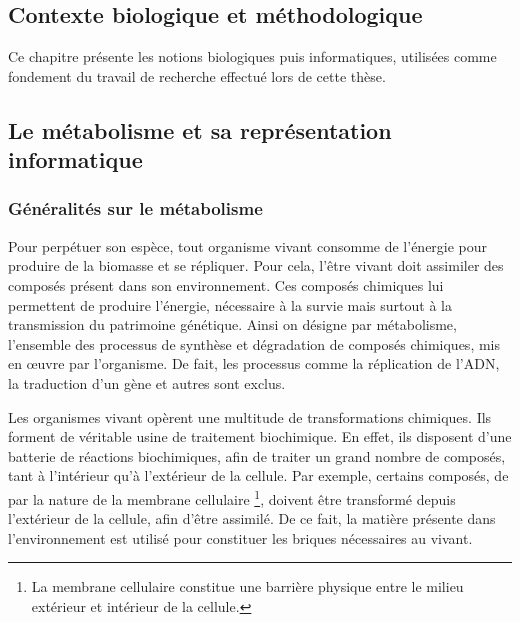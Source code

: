 \begin{refsegment}
	\chapter{Contexte biologique et méthodologique}

    Ce chapitre présente les notions biologiques puis informatiques, utilisées comme fondement du travail de recherche effectué lors de cette thèse.
    
    
    \section{Le métabolisme et sa représentation informatique}
    \subsection{Généralités sur le métabolisme}
    
    Pour perpétuer son espèce, tout organisme vivant consomme de l'énergie pour produire de la biomasse et se répliquer. Pour cela, l'être vivant doit assimiler des composés présent dans son environnement. Ces composés chimiques lui permettent de produire l'énergie, nécessaire  à la survie mais surtout à la transmission du patrimoine génétique. Ainsi on désigne par métabolisme, l'ensemble des processus de synthèse et dégradation de composés chimiques, mis en œuvre par l'organisme. De fait, les processus comme la réplication de l'\acrfull{ADN}, la traduction d'un gène et autres sont exclus.
    
    
    Les organismes vivant opèrent une multitude de transformations chimiques. Ils forment de véritable usine de traitement biochimique. En effet, ils disposent d'une batterie de réactions biochimiques, afin de traiter un grand nombre de composés, tant à l'intérieur qu'à l'extérieur de la cellule. Par exemple, certains composés, de par la nature de la membrane cellulaire \footnote{La membrane cellulaire constitue une barrière physique entre le milieu extérieur et intérieur de la cellule.}, doivent être transformé depuis l'extérieur de la cellule, afin d'être assimilé. De ce fait, la matière présente dans l'environnement est utilisé pour constituer les briques nécessaires au vivant.
    

\end{refsegment}
